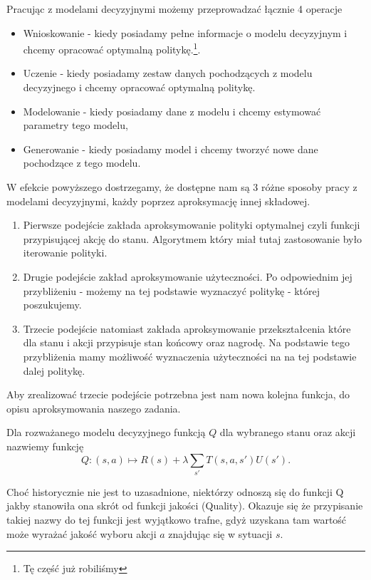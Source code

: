 \documentclass[10pt,a4paper]{book}
\begin{document}
\begin{remark}
Pracując z modelami decyzyjnymi możemy przeprowadzać łącznie 4 operacje
\begin{itemize}
\item Wnioskowanie - kiedy posiadamy pełne informacje o modelu decyzyjnym i chcemy opracować optymalną politykę.\footnote{Tę część już robiliśmy}.
\item Uczenie - kiedy posiadamy zestaw danych pochodzących z modelu decyzyjnego i chcemy opracować optymalną politykę.
\item Modelowanie - kiedy posiadamy dane z modelu i chcemy estymować parametry tego modelu,
\item Generowanie - kiedy posiadamy model i chcemy tworzyć nowe dane pochodzące z tego modelu.
\end{itemize}
\end{remark}

W efekcie powyższego dostrzegamy, że dostępne nam są 3 różne sposoby pracy z modelami decyzyjnymi, każdy poprzez aproksymację innej składowej.

\begin{enumerate}
\item Pierwsze podejście zakłada aproksymowanie polityki optymalnej czyli funkcji przypisującej akcję do stanu. Algorytmem który miał tutaj zastosowanie było iterowanie polityki.
\item Drugie podejście zakład aproksymowanie użyteczności. Po odpowiednim jej przybliżeniu - możemy na tej podstawie wyznaczyć politykę - której poszukujemy.
\item Trzecie podejście natomiast zakłada aproksymowanie przekształcenia które dla stanu i akcji przypisuje stan końcowy oraz nagrodę. Na podstawie tego przybliżenia mamy możliwość wyznaczenia użyteczności na na tej podstawie dalej politykę.
\end{enumerate}

Aby zrealizować trzecie podejście potrzebna jest nam nowa kolejna funkcja, do opisu aproksymowania naszego zadania.


\begin{definition}[Funkcja Q]
Dla rozważanego modelu decyzyjnego funkcją $Q$ dla wybranego stanu oraz akcji nazwiemy funkcję
$$
Q : (s,a) \mapsto R(s) + \lambda \sum_{s'} T(s,a,s') U(s').
$$
\end{definition}

\begin{remark*}
Choć historycznie nie jest to uzasadnione, niektórzy odnoszą się do funkcji Q jakby stanowiła ona skrót od funkcji jakości (Quality). Okazuje się że przypisanie takiej nazwy do tej funkcji jest wyjątkowo trafne, gdyż uzyskana tam wartość może wyrażać jakość wyboru akcji $a$ znajdując się w sytuacji $s$.
\end{remark*}
\end{document}

